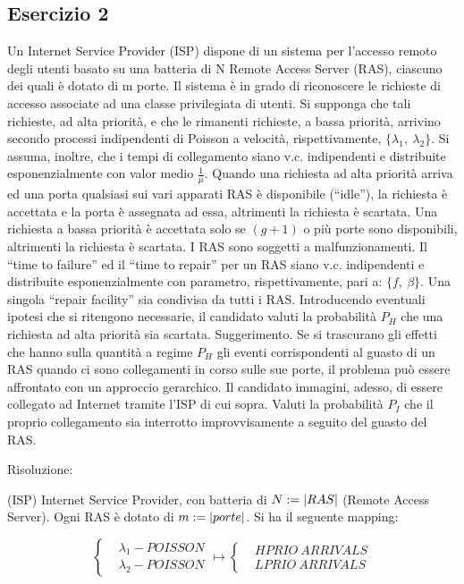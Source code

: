 \subsection{Esercizio 2}

Un Internet Service Provider (ISP) dispone di un sistema per l’accesso remoto degli utenti basato su una batteria di N Remote Access Server (RAS), ciascuno dei quali è dotato di m porte. Il sistema è in grado di riconoscere le richieste di accesso associate ad una classe privilegiata di utenti. Si supponga che tali richieste, ad alta priorità, e che le rimanenti richieste, a bassa priorità, arrivino secondo processi indipendenti di Poisson  a velocità, rispettivamente, $\{\lambda_1,\ \lambda_2\}$. Si assuma, inoltre, che i tempi di collegamento siano v.c. indipendenti e distribuite esponenzialmente con valor medio $\frac{1}{\mu}$. Quando una richiesta ad alta priorità arriva ed una porta qualsiasi sui vari apparati RAS è disponibile (“idle”), la richiesta è accettata e la porta è assegnata ad essa, altrimenti la richiesta è scartata. Una richiesta a bassa priorità è accettata solo se $(g+1)$ o più porte sono disponibili, altrimenti la richiesta è scartata.  I RAS sono soggetti a malfunzionamenti. Il “time to failure” ed il “time to repair” per un RAS siano v.c. indipendenti e distribuite esponenzialmente con parametro, rispettivamente, pari a: $\{f,\ \beta\}$. Una singola “repair facility” sia condivisa da tutti i RAS. Introducendo eventuali ipotesi che si ritengono necessarie, il candidato valuti la probabilità $P_H$ che una richiesta ad alta priorità sia scartata. Suggerimento. Se si trascurano gli effetti che hanno sulla quantità a regime $P_H$ gli eventi corrispondenti al guasto di un RAS quando ci sono collegamenti in corso sulle sue porte, il problema può essere affrontato con un approccio gerarchico.  
Il candidato immagini, adesso, di essere collegato ad Internet tramite l’ISP di cui sopra. Valuti la probabilità $P_I$ che il proprio collegamento sia interrotto improvvisamente a seguito del guasto del RAS.

Risoluzione:

(ISP) Internet Service Provider, con batteria di $N:=\left\vert{RAS}\right\vert$ (Remote Access Server). Ogni RAS è dotato di $m:=\left\vert{porte}\right\vert$. Si ha il seguente mapping:

\[
	\left\{
	\begin{aligned}
	&\lambda_1-POISSON\\
	&\lambda_2-POISSON
	\end{aligned}
	\right. \mapsto
	\left\{
	\begin{aligned}
	&HPRIO\ ARRIVALS\\
	&LPRIO\ ARRIVALS
	\end{aligned}
	\right.
\]


